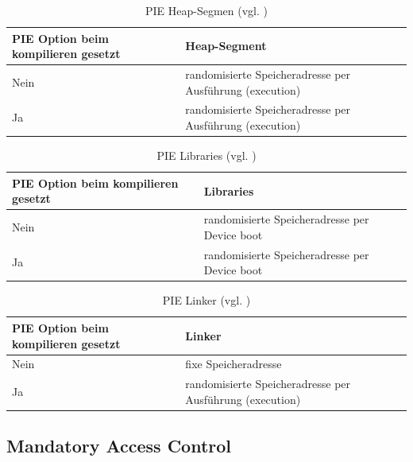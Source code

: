 \begin{table}
    \begin{center}
       \begin{tabular}{|p{4cm}|p{11cm}|} \hline
            PIE Option beim kompilieren gesetzt & Heap-Segment\\ \hline
            Nein & randomisierte Speicheradresse per Ausführung (execution)\\ \hline
            Ja & randomisierte Speicheradresse per Ausführung (execution)\\ \hline
        \end{tabular}
        \caption{PIE Heap-Segmen (vgl. \cite{iOSSec[5]}) }
       \label{tab:PIE heap segment}
    \end{center}
\end{table}

\begin{table}
    \begin{center}
      \begin{tabular}{|p{4cm}|p{11cm}|} \hline
            PIE Option beim kompilieren gesetzt & Libraries \\ \hline
            Nein & randomisierte Speicheradresse per Device boot\\ \hline
            Ja & randomisierte Speicheradresse per Device boot \\ \hline
        \end{tabular}
        \caption{PIE Libraries (vgl. \cite{iOSSec[5]})}
       \label{tab:PIE libraries}
    \end{center}
\end{table}

 \begin{table}
    \begin{center}
        \begin{tabular}{|p{4cm}|p{11cm}|} \hline
            PIE Option beim kompilieren gesetzt & Linker  \\ \hline
            Nein & fixe Speicheradresse \\ \hline
            Ja & randomisierte Speicheradresse per Ausführung (execution)\\ \hline
        \end{tabular}
        \caption{PIE Linker (vgl. \cite{iOSSec[5]})}
       \label{tab:PIE linker }
    \end{center}
\end{table}

\subsection{Mandatory Access Control}
\label{sec:MAC}

